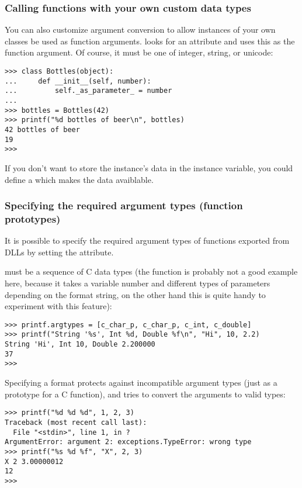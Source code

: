 \subsubsection{Calling functions with your own custom data types\label{ctypes-calling-functions-with-own-custom-data-types}}

You can also customize  argument conversion to allow
instances of your own classes be used as function arguments.
 looks for an  attribute and uses this as
the function argument. Of course, it must be one of integer, string,
or unicode:
\begin{verbatim}
>>> class Bottles(object):
...     def __init__(self, number):
...         self._as_parameter_ = number
...
>>> bottles = Bottles(42)
>>> printf("%d bottles of beer\n", bottles)
42 bottles of beer
19
>>>
\end{verbatim}

If you don't want to store the instance's data in the
 instance variable, you could define a 
which makes the data avaiblable.


\subsubsection{Specifying the required argument types (function prototypes)\label{ctypes-specifying-required-argument-types}}

It is possible to specify the required argument types of functions
exported from DLLs by setting the  attribute.

 must be a sequence of C data types (the 
function is probably not a good example here, because it takes a
variable number and different types of parameters depending on the
format string, on the other hand this is quite handy to experiment
with this feature):
\begin{verbatim}
>>> printf.argtypes = [c_char_p, c_char_p, c_int, c_double]
>>> printf("String '%s', Int %d, Double %f\n", "Hi", 10, 2.2)
String 'Hi', Int 10, Double 2.200000
37
>>>
\end{verbatim}

Specifying a format protects against incompatible argument types (just
as a prototype for a C function), and tries to convert the arguments
to valid types:
\begin{verbatim}
>>> printf("%d %d %d", 1, 2, 3)
Traceback (most recent call last):
  File "<stdin>", line 1, in ?
ArgumentError: argument 2: exceptions.TypeError: wrong type
>>> printf("%s %d %f", "X", 2, 3)
X 2 3.00000012
12
>>>
\end{verbatim}

